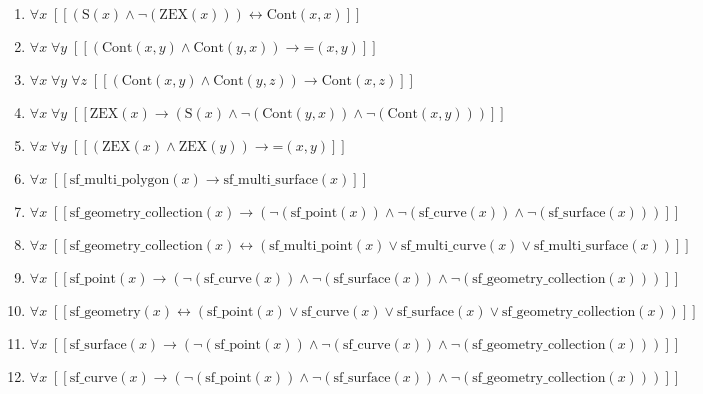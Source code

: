 \documentclass{article}
\begin{document}
\begin{enumerate}
\item $\forall x\;  \left[ \left[ \left(\textrm{S}(x) \land \neg \left(\textrm{ZEX}(x)\right)\right) \leftrightarrow \textrm{Cont}(x,x) \right] \right]$
\item $\forall x\; \forall y\;  \left[ \left[ \left(\textrm{Cont}(x,y) \land \textrm{Cont}(y,x)\right) \rightarrow \textrm{=}(x,y) \right] \right]$
\item $\forall x\; \forall y\; \forall z\;  \left[ \left[ \left(\textrm{Cont}(x,y) \land \textrm{Cont}(y,z)\right) \rightarrow \textrm{Cont}(x,z) \right] \right]$
\item $\forall x\; \forall y\;  \left[ \left[ \textrm{ZEX}(x) \rightarrow \left(\textrm{S}(x) \land \neg \left(\textrm{Cont}(y,x)\right) \land \neg \left(\textrm{Cont}(x,y)\right)\right) \right] \right]$
\item $\forall x\; \forall y\;  \left[ \left[ \left(\textrm{ZEX}(x) \land \textrm{ZEX}(y)\right) \rightarrow \textrm{=}(x,y) \right] \right]$
\item $\forall x\;  \left[ \left[ \textrm{sf\_multi\_polygon}(x) \rightarrow \textrm{sf\_multi\_surface}(x) \right] \right]$
\item $\forall x\;  \left[ \left[ \textrm{sf\_geometry\_collection}(x) \rightarrow \left(\neg \left(\textrm{sf\_point}(x)\right) \land \neg \left(\textrm{sf\_curve}(x)\right) \land \neg \left(\textrm{sf\_surface}(x)\right)\right) \right] \right]$
\item $\forall x\;  \left[ \left[ \textrm{sf\_geometry\_collection}(x) \leftrightarrow \left(\textrm{sf\_multi\_point}(x) \lor \textrm{sf\_multi\_curve}(x) \lor \textrm{sf\_multi\_surface}(x)\right) \right] \right]$
\item $\forall x\;  \left[ \left[ \textrm{sf\_point}(x) \rightarrow \left(\neg \left(\textrm{sf\_curve}(x)\right) \land \neg \left(\textrm{sf\_surface}(x)\right) \land \neg \left(\textrm{sf\_geometry\_collection}(x)\right)\right) \right] \right]$
\item $\forall x\;  \left[ \left[ \textrm{sf\_geometry}(x) \leftrightarrow \left(\textrm{sf\_point}(x) \lor \textrm{sf\_curve}(x) \lor \textrm{sf\_surface}(x) \lor \textrm{sf\_geometry\_collection}(x)\right) \right] \right]$
\item $\forall x\;  \left[ \left[ \textrm{sf\_surface}(x) \rightarrow \left(\neg \left(\textrm{sf\_point}(x)\right) \land \neg \left(\textrm{sf\_curve}(x)\right) \land \neg \left(\textrm{sf\_geometry\_collection}(x)\right)\right) \right] \right]$
\item $\forall x\;  \left[ \left[ \textrm{sf\_curve}(x) \rightarrow \left(\neg \left(\textrm{sf\_point}(x)\right) \land \neg \left(\textrm{sf\_surface}(x)\right) \land \neg \left(\textrm{sf\_geometry\_collection}(x)\right)\right) \right] \right]$

\end{enumerate}
\end{document}
